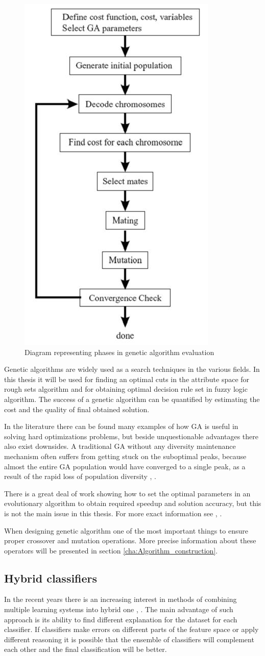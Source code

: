 \begin{figure}[H] 
    \begin{center}
        \includegraphics[height=0.5\textwidth]{fig/genetic.png}
    \end{center}
    \caption{Diagram representing phases in genetic algorithm evaluation}
    \label{fig:genetic_scheme}
\end{figure}

Genetic algorithms are widely used as a search techniques in the various fields. 
In this thesis it will be used for finding an optimal cuts in the attribute
space for rough sets algorithm and for obtaining optimal decision rule set in
fuzzy logic algorithm. The success of a genetic algorithm can be quantified by estimating 
the cost and the quality of final obtained solution. 

In the literature there can be found many examples of how GA is useful in solving hard 
optimizations problems, but beside unquestionable advantages there also exist downsides. 
A traditional GA without any diversity maintenance mechanism often suffers from getting 
stuck on the suboptimal peaks, because almost the entire GA population would have converged 
to a single peak, as a result of the rapid loss of population diversity \cite{bib44}, \cite{bib45}. 

There is a great deal of work showing how to set the optimal parameters in an evolutionary 
algorithm to obtain required speedup and solution accuracy, but this is not the main issue 
in this thesis. For more exact information see \cite{bib42}, \cite{bib43}.

When designing genetic algorithm one of the most important things to ensure proper crossover 
and mutation operations. More precise information about these operators will be
presented in section \ref{cha:Algorithm_construction}.

\subsection{Hybrid classifiers} 
\label{cha:Hybrid_classifiers}
In the recent years there is an increasing interest in methods of combining
multiple learning systems into hybrid one \cite{bib5}, \cite{bib6}. The main advantage of such approach
is its ability to find different explanation for the dataset for each
classifier. If classifiers make errors on different parts of the feature space
or apply different reasoning it is possible that the ensemble of classifiers will complement each other and
the final classification will be better. 

